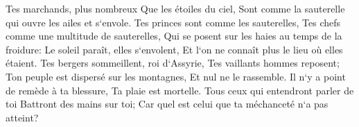 \verse Tes marchands, plus nombreux Que les étoiles du ciel, Sont comme la sauterelle qui ouvre les ailes et s`envole. 
\verse Tes princes sont comme les sauterelles, Tes chefs comme une multitude de sauterelles, Qui se posent sur les haies au temps de la froidure: Le soleil paraît, elles s`envolent, Et l`on ne connaît plus le lieu où elles étaient. 
\verse Tes bergers sommeillent, roi d`Assyrie, Tes vaillants hommes reposent; Ton peuple est dispersé sur les montagnes, Et nul ne le rassemble. 
\verse Il n`y a point de remède à ta blessure, Ta plaie est mortelle. Tous ceux qui entendront parler de toi Battront des mains sur toi; Car quel est celui que ta méchanceté n`a pas atteint? 
